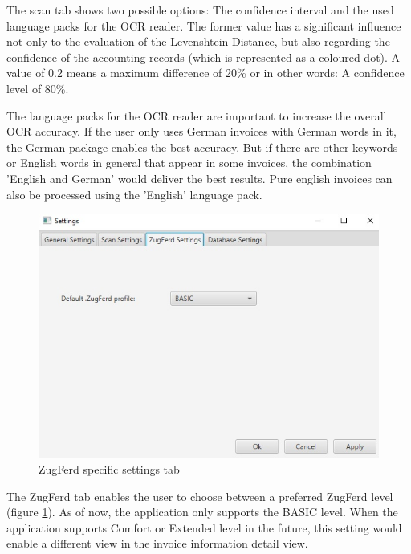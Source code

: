 The scan tab shows two possible options: The confidence interval and the used language packs for the OCR reader. The former value has a significant influence not only to the evaluation of the Levenshtein-Distance, but also regarding the confidence of the accounting records (which is represented as a coloured dot). A value of 0.2 means a maximum difference of 20\% or in other words: A confidence level of 80\%.

The language packs for the OCR reader are important to increase the overall OCR accuracy. If the user only uses German invoices with German words in it, the German package enables the best accuracy. But if there are other keywords or English words in general that appear in some invoices, the combination 'English and German' would deliver the best results. Pure english invoices can also be processed using the 'English' language pack.

\begin{figure}[ht!]
\centering
\includegraphics[scale=0.6]{Images/GUI/settings_ZugFerd.jpg}
\caption{ZugFerd specific settings tab \label{settings_ZugFerd}}
\end{figure}

The ZugFerd tab enables the user to choose between a preferred ZugFerd level (figure \ref{settings_ZugFerd}). As of now, the application only supports the BASIC level. When the application supports Comfort or Extended level in the future, this setting would enable a different view in the invoice information detail view.


